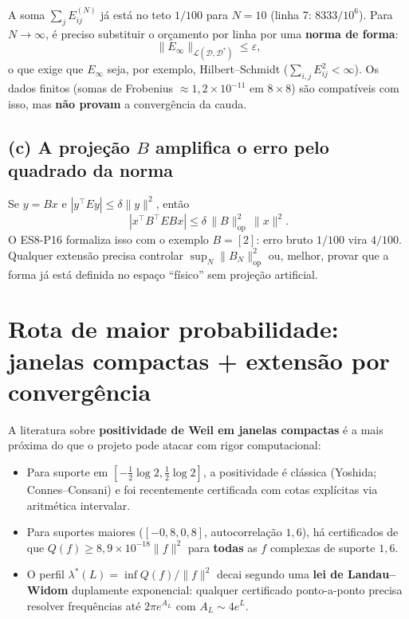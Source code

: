 \documentclass[11pt,a4paper]{article}
\theoremstyle{definition}
\theoremstyle{remark}
\newcommand{\op}{\mathrm{op}}
\newcommand{\Lin}{\mathcal{L}}
\newcommand{\D}{\mathcal{D}}
\begin{document}
A soma \(\sum_j E^{(N)}_{ij}\) já está no teto \(1/100\) para \(N=10\)
(linha 7: \(8333/10^6\)). Para \(N\to\infty\), é preciso substituir o orçamento
por linha por uma \textbf{norma de forma}:
\[
\|E_\infty\|_{\Lin(\D,\D^*)}\le \varepsilon,
\]
o que exige que \(E_\infty\) seja, por exemplo, Hilbert--Schmidt
(\(\sum_{i,j}E_{ij}^2<\infty\)). Os dados finitos (somas de Frobenius
\(\approx 1{,}2\times 10^{-11}\) em \(8\times 8\)) são compatíveis com isso,
mas \textbf{não provam} a convergência da cauda.

\subsection*{(c) A projeção \(B\) amplifica o erro pelo quadrado da norma}

Se \(y=Bx\) e \(|y^\top E y|\le \delta\|y\|^2\), então
\[
|x^\top B^\top E B x|\le \delta\,\|B\|_{\op}^2\,\|x\|^2.
\]
O ES8-P16 formaliza isso com o exemplo \(B=[2]\): erro bruto \(1/100\) vira
\(4/100\). Qualquer extensão precisa controlar
\(\sup_N\|B_N\|_{\op}^2\) ou, melhor, provar que a forma já está definida no
espaço ``físico'' sem projeção artificial.

\section{Rota de maior probabilidade: janelas compactas + extensão por convergência}

A literatura sobre \textbf{positividade de Weil em janelas compactas} é a mais
próxima do que o projeto pode atacar com rigor computacional:

\begin{itemize}
  \item Para suporte em
        \([-\tfrac12\log 2,\tfrac12\log 2]\), a positividade é clássica
        (Yoshida; Connes--Consani) e foi recentemente certificada com cotas
        explícitas via aritmética intervalar.
  \item Para suportes maiores (\([-0{,}8,0{,}8]\), autocorrelação \(1{,}6\)),
        há certificados de que \(Q(f)\ge 8{,}9\times 10^{-18}\|f\|^2\) para
        \textbf{todas} as \(f\) complexas de suporte \(1{,}6\).
  \item O perfil \(\lambda^*(L)=\inf Q(f)/\|f\|^2\) decai segundo uma
        \textbf{lei de Landau--Widom} duplamente exponencial: qualquer
        certificado ponto-a-ponto precisa resolver frequências até
        \(2\pi e^{A_L}\) com \(A_L\sim 4e^L\).
\end{itemize}
\end{document}
